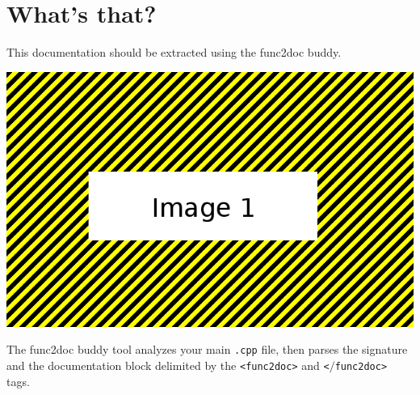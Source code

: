 \section{What's that?}

This documentation should be extracted using the func2doc buddy.\\

\begin{center}
\includegraphics[scale=0.2]{doc/images/image1.png}
\end{center}

The func2doc buddy tool analyzes your main \texttt{.cpp} file,
then parses the signature
and the documentation block delimited by the \texttt{<func2doc>} and \texttt{<$/$func2doc>} tags.



